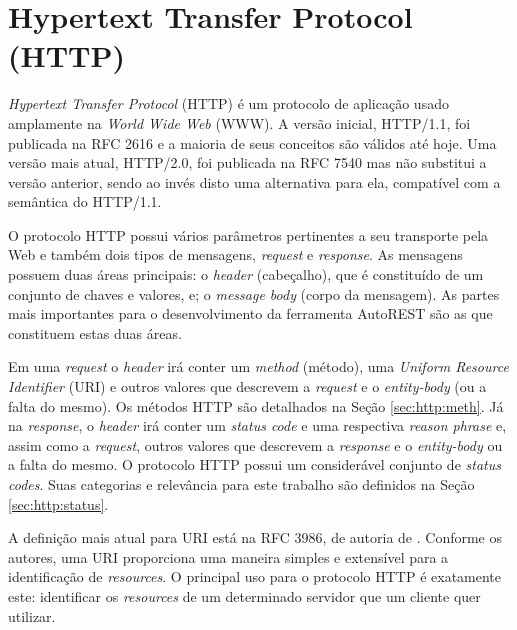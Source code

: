 
\section{Hypertext Transfer Protocol (HTTP)}

\textit{Hypertext Transfer Protocol} (HTTP) é um protocolo de aplicação \cite{RFC1123} usado amplamente na \textit{World Wide Web} (WWW). A versão inicial, HTTP/1.1, foi publicada na RFC 2616 \cite{RFC2616} e a maioria de seus conceitos são válidos até hoje. Uma versão mais atual, HTTP/2.0, foi publicada na RFC 7540 \cite{RFC7540} mas não substitui a versão anterior, sendo ao invés disto uma alternativa para ela, compatível com a semântica do HTTP/1.1.

O protocolo HTTP possui vários parâmetros pertinentes a seu transporte pela Web e também dois tipos de mensagens, \textit{request} e \textit{response}. As mensagens possuem duas áreas principais: o \textit{header} (cabeçalho), que é constituído de um conjunto de chaves e valores, e; o \textit{message body} (corpo da mensagem). As partes mais importantes para o desenvolvimento da ferramenta AutoREST são as que constituem estas duas áreas.

Em uma \textit{request} o \textit{header} irá conter um \textit{method} (método), uma \textit{Uniform Resource Identifier} (URI) e outros valores que descrevem a \textit{request} e o \textit{entity-body} (ou a falta do mesmo). Os métodos HTTP são detalhados na Seção \ref{sec:http:meth}. Já na \textit{response}, o \textit{header} irá conter um \textit{status code} e uma respectiva \textit{reason phrase} e, assim como a \textit{request}, outros valores que descrevem a \textit{response} e o \textit{entity-body} ou a falta do mesmo. O protocolo HTTP possui um considerável conjunto de \textit{status codes}. Suas categorias e relevância para este trabalho são definidos na Seção \ref{sec:http:status}.

A definição mais atual para URI está na RFC 3986, de autoria de . Conforme os autores, uma URI proporciona uma maneira simples e extensível para a identificação de \textit{resources}. O principal uso para o protocolo HTTP é exatamente este: identificar os \textit{resources} de um determinado servidor que um cliente quer utilizar.

